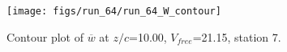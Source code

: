 \begin{figure}[H]
\centering
\texttt{[image: figs/run\_64/run\_64\_W\_contour]}
\caption{Contour plot of $\overline{w}$ at $z/c$=10.00, $V_{free}$=21.15, station 7.}
\end{figure}


